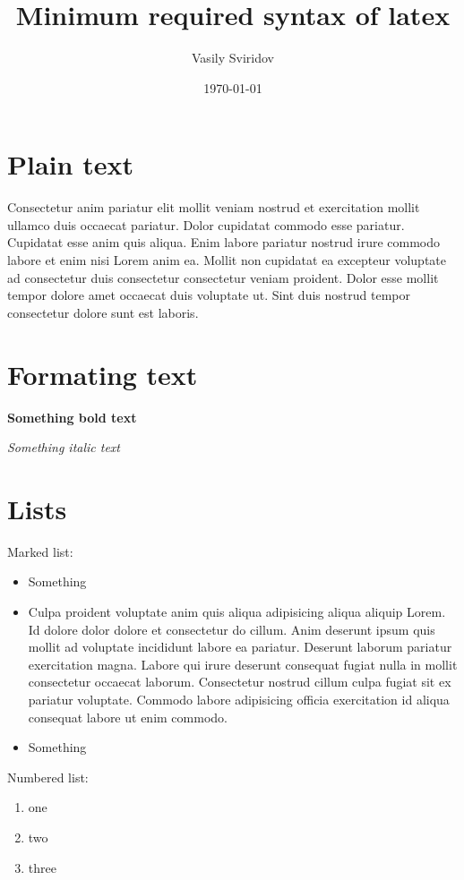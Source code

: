 \documentclass[a4paper, 12pt]{article} %
\author{Vasily Sviridov} %
\title{Minimum required syntax of latex}
\date{\today} %
\begin{document}
\maketitle %

\clearpage %

\section{Plain text}
Consectetur anim pariatur elit mollit veniam nostrud et exercitation mollit ullamco duis occaecat pariatur. Dolor cupidatat commodo esse pariatur. Cupidatat esse anim quis aliqua. Enim labore pariatur nostrud irure commodo labore et enim nisi Lorem anim ea. Mollit non cupidatat ea excepteur voluptate ad consectetur duis consectetur consectetur veniam proident. Dolor esse mollit tempor dolore amet occaecat duis voluptate ut. Sint duis nostrud tempor consectetur dolore sunt est laboris.
\section{Formating text}
\textbf{Something bold text}

\textit{Something italic text}

\section{Lists}
Marked list:
\begin{itemize}
    \item Something
    \item Culpa proident voluptate anim quis aliqua adipisicing aliqua aliquip Lorem. Id dolore dolor dolore et consectetur do cillum. Anim deserunt ipsum quis mollit ad voluptate incididunt labore ea pariatur. Deserunt laborum pariatur exercitation magna. Labore qui irure deserunt consequat fugiat nulla in mollit consectetur occaecat laborum. Consectetur nostrud cillum culpa fugiat sit ex pariatur voluptate. Commodo labore adipisicing officia exercitation id aliqua consequat labore ut enim commodo.
    \item Something
\end{itemize}
Numbered list:
\begin{enumerate}
    \item one
    \item two
    \item three
\end{enumerate}
\end{document}
